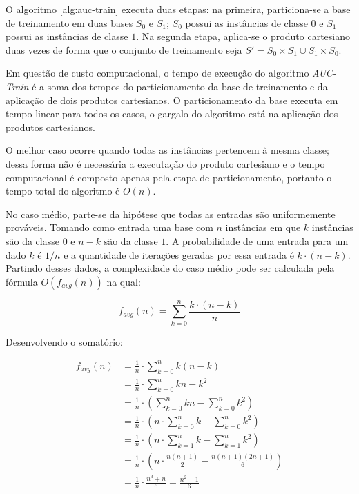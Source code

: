 O algoritmo \ref{alg:auc-train} executa duas etapas: na primeira, particiona-se a base de treinamento em duas bases $S_0$ e $S_1$; $S_0$ possui as instâncias de classe $0$ e $S_1$ possui as instâncias de classe $1$. Na segunda etapa, aplica-se o produto cartesiano duas vezes de forma que o conjunto de treinamento seja $S' = S_0 \times S_1 \cup S_1 \times S_0$.

Em questão de custo computacional, o tempo de execução do algoritmo \emph{AUC-Train} é a soma dos tempos do particionamento da base de treinamento e da aplicação de dois produtos cartesianos. O particionamento da base executa em tempo linear para todos os casos, o gargalo do algoritmo está na aplicação dos produtos cartesianos.

O melhor caso ocorre quando todas as instâncias pertencem à mesma classe; dessa forma  não é necessária a executação do produto cartesiano e o tempo computacional é composto apenas pela etapa de particionamento, portanto o tempo total do algoritmo é $O(n)$.

No caso médio, parte-se da hipótese que todas as entradas são uniformemente prováveis. Tomando como entrada uma base com $n$ instâncias em que $k$ instâncias são da classe $0$ e $n - k$ são da classe $1$. A probabilidade de uma entrada para um dado $k$ é $1/n$ e a quantidade de iterações geradas por essa entrada é $k \cdot (n - k)$. Partindo desses dados, a complexidade do caso médio pode ser calculada pela fórmula $O(f_{avg}(n))$ na qual:

\[f_{avg}(n) = \sum_{k = 0}^{n} \frac{k \cdot (n - k)}{n}\]

Desenvolvendo o somatório:

\begin{align*}
    f_{avg}(n) &= \frac{1}{n} \cdot \sum_{k = 0}^{n} k(n - k) \\
               &= \frac{1}{n} \cdot \sum_{k = 0}^{n} kn - k^2 \\
               &= \frac{1}{n} \cdot \left(\sum_{k = 0}^{n} kn - \sum_{k = 0}^{n} k^2\right) \\
               &= \frac{1}{n} \cdot \left(n \cdot \sum_{k = 0}^{n} k - \sum_{k = 0}^{n} k^2\right) \\
               &= \frac{1}{n} \cdot \left(n \cdot \sum_{k = 1}^{n} k - \sum_{k = 1}^{n} k^2\right) \\
               &= \frac{1}{n} \cdot \left(n \cdot \frac{n(n + 1)}{2} - \frac{n(n + 1)(2n + 1)}{6}\right) \\
               &= \frac{1}{n} \cdot \frac{n^3 + n}{6} = \frac{n^2 -1}{6}
\end{align*}

